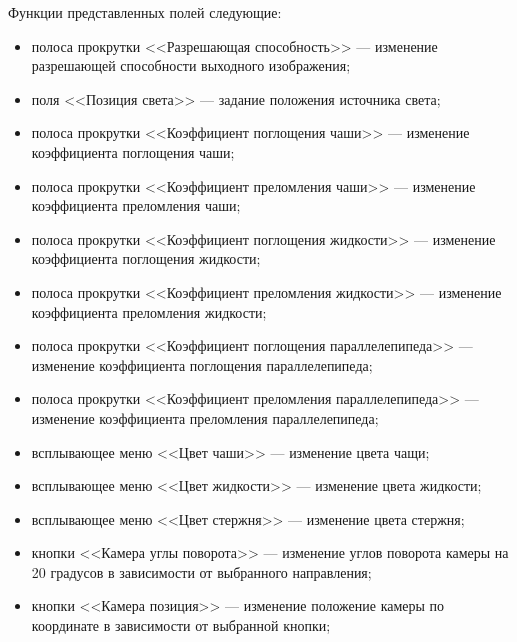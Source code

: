 \begin{figure}[ht!]
\end{figure}

Функции представленных полей следующие:
\begin{itemize}
	\item полоса прокрутки <<Разрешающая способность>> --- изменение разрешающей способности выходного изображения;
	\item поля <<Позиция света>> --- задание положения источника света;
	\item полоса прокрутки <<Коэффициент поглощения чаши>> --- изменение коэффициента поглощения чаши;
	\item полоса прокрутки <<Коэффициент преломления чаши>> --- изменение коэффициента преломления чаши;
	\item полоса прокрутки <<Коэффициент поглощения жидкости>> --- изменение коэффициента поглощения жидкости;
	\item полоса прокрутки <<Коэффициент преломления жидкости>> --- изменение коэффициента преломления жидкости;
	\item полоса прокрутки <<Коэффициент поглощения параллелепипеда>> --- изменение коэффициента поглощения параллелепипеда;
	\item полоса прокрутки <<Коэффициент преломления параллелепипеда>> --- изменение коэффициента преломления параллелепипеда;
	\item всплывающее меню <<Цвет чаши>> --- изменение цвета чащи;
	\item всплывающее меню <<Цвет жидкости>> --- изменение цвета жидкости;
	\item всплывающее меню <<Цвет стержня>> --- изменение цвета стержня;
	\item кнопки <<Камера углы поворота>> --- изменение углов поворота камеры на 20 градусов в зависимости от выбранного направления;
	\item кнопки <<Камера позиция>> --- изменение положение камеры по координате в зависимости от выбранной кнопки;
	\begin{itemize}

\end{itemize}
\end{itemize}
